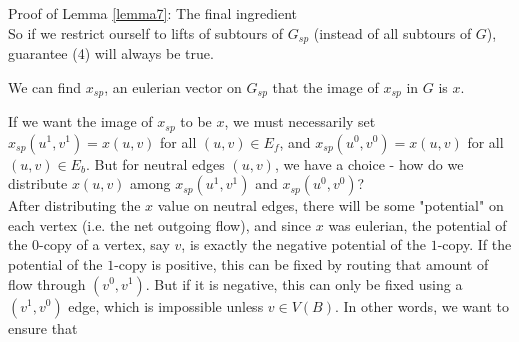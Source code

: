 \documentclass[./main.tex]{subfiles}
\begin{document}
\begin{subsection}{Proof of Lemma \ref{lemma7}: The final ingredient}
\\So if we restrict ourself to lifts of subtours of $G_{sp}$ (instead of all subtours of $G$), guarantee (4) will always be true.\vspace{2mm}
\begin{lemma}
We can find $x_{sp}$, an eulerian vector on $G_{sp}$ that the image of $x_{sp}$ in $G$ is $x$.
\end{lemma}
If we want the image of $x_{sp}$ to be $x$, we must necessarily set $x_{sp}(u^1,v^1)=x(u,v)$ for all $(u,v)\in E_f$, and $x_{sp}(u^0,v^0) = x(u,v)$ for all $(u,v)\in E_b$. But for neutral edges $(u,v)$, we have a choice - how do we distribute $x(u,v)$ among $x_{sp}(u^1,v^1)$ and $x_{sp}(u^0,v^0)$?\vspace{2mm}
\\After distributing the $x$ value on neutral edges, there will be some "potential" on each vertex (i.e. the net outgoing flow), and since $x$ was eulerian, the potential of the $0$-copy of a vertex, say $v$, is exactly the negative potential of the $1$-copy. If the potential of the $1$-copy is positive, this can be fixed by routing that amount of flow through $(v^0,v^1)$. But if it is negative, this can only be fixed using a $(v^1,v^0)$ edge, which is impossible unless $v\in V(B)$. In other words, we want to ensure that 
\end{subsection}
\end{document}
